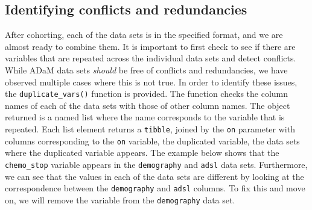 \hypertarget{identifying-conflicts-and-redundancies}{%
\subsection{Identifying conflicts and
redundancies}\label{identifying-conflicts-and-redundancies}}

After cohorting, each of the data sets is in the specified format, and
we are almost ready to combine them. It is important to first check to
see if there are variables that are repeated across the individual data
sets and detect conflicts. While ADaM data sets \emph{should} be free of
conflicts and redundancies, we have observed multiple cases where this
is not true. In order to identify these issues, the
\texttt{duplicate\_vars()} function is provided. The function checks the
column names of each of the data sets with those of other column names.
The object returned is a named list where the name corresponds to the
variable that is repeated. Each list element returns a \texttt{tibble},
joined by the \texttt{on} parameter with columns corresponding to the
\texttt{on} variable, the duplicated variable, the data sets where the
duplicated variable appears. The example below shows that the
\texttt{chemo\_stop} variable appears in the \texttt{demography} and
\texttt{adsl} data sets. Furthermore, we can see that the values in each
of the data sets are different by looking at the correspondence between
the \texttt{demography} and \texttt{adsl} columns. To fix this and move
on, we will remove the variable from the \texttt{demography} data set.

